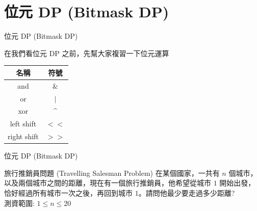 \documentclass[aspectratio=169]{beamer}
\begin{document}
\section{位元 DP (Bitmask DP)}

\begin{frame}[fragile]{位元 DP (Bitmask DP)}
    \item 在我們看位元 DP 之前，先幫大家複習一下位元運算 \\
    \begin{center}
        \begin{tabular}{|c|c|}
            \hline
             名稱 & 符號 \\ \hline \hline
             and  & $\mathtt{\&}$ \\ \hline
             or   & $\mathtt{|}$  \\ \hline
             xor  & $\mathtt{\^}$ \\ \hline
             left shift & $\mathtt{<<}$ \\ \hline
             right shift & $\mathtt{>>}$ \\ \hline
        \end{tabular}
    \end{center}
\end{frame}

\begin{frame}[fragile]{位元 DP (Bitmask DP)}
    \begin{block}{旅行推銷員問題 (Travelling Salesman Problem)}
        在某個國家，一共有 $n$ 個城市，以及兩個城市之間的距離，現在有一個旅行推銷員，他希望從城市 $1$ 開始出發，恰好經過所有城市一次之後，再回到城市 $1$。請問他最少要走過多少距離? \\
        \vspace{5mm}
        測資範圍: $1 \le n \le 20$
    \end{block}
\end{frame}
\end{document}
